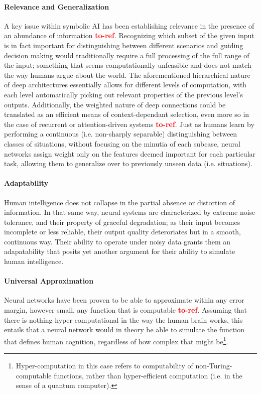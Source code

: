 \documentclass[]{article}
\newcommand\toref{\textcolor{red}{\bf{to-ref}}}
\begin{document}
\paragraph{Relevance and Generalization}
A key issue within symbolic AI has been establishing relevance in the presence of an abundance of information \toref. Recognizing which subset of the given input is in fact important for distinguishing between different scenarios and guiding decision making would traditionally require a full processing of the full range of the input; something that seems computationally unfeasible and does not match the way humans argue about the world. The aforementioned hierarchical nature of deep architectures essentially allows for different levels of computation, with each level automatically picking out relevant properties of the previous level's outputs. Additionally, the weighted nature of deep connections could be translated as an efficient means of context-dependant selection, even more so in the case of recurrent or attention-driven systems \toref . Just as humans learn by performing a continuous (i.e. non-sharply separable) distinguishing between classes of situations, without focusing on the minutia of each subcase, neural networks assign weight only on the features deemed important for each particular task, allowing them to generalize over to previously unseen data (i.e. situations).

\paragraph{Adaptability}
Human intelligence does not collapse in the partial absence or distortion of information. In that same way, neural systems are characterized by extreme noise tolerance, and their property of graceful degradation; as their input becomes incomplete or less reliable, their output quality deteroriates but in a smooth, continuous way. Their ability to operate under noisy data grants them an adapatability that posits yet another argument for their ability to simulate human intelligence. 

\paragraph{Universal Approximation}
Neural networks have been proven to be able to approximate within any error margin, however small, any function that is computable \toref . Assuming that there is nothing hyper-computational in the way the human brain works, this entails that a neural network would in theory be able to simulate the function that defines human cognition, regardless of how complex that might be\footnote{Hyper-computation in this case refers to computability of non-Turing-computable functions, rather than hyper-efficient computation (i.e. in the sense of a quantum computer).}. 
\end{document}
